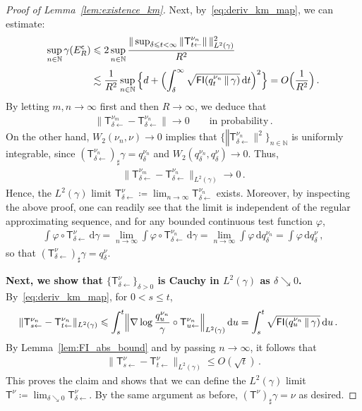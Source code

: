 \documentclass[10pt,a4paper]{amsart}
\DeclareMathOperator*{\FI}{\mathsf{FI}}
\newcommand{\KM}{\mathsf T}
\newcommand{\N}{\mathbb{N}}
\newcommand{\comp}{\mathsf c}
\newcommand*{\dd}{\, \rd}
\newcommand{\deq}{\coloneqq}
\renewcommand{\le}{\leqslant}
\newcommand{\mmid}{\,\Vert\,}
\renewcommand{\phi}{\varphi}
\newcommand*{\rd}{\mathrm{d}}
\begin{document}
\begin{proof}[Proof of Lemma~\ref{lem:existence_km}]
    Next, by~\eqref{eq:deriv_km_map}, we can estimate:
    \begin{align*}
        \sup_{n\in\N} \gamma(E_R^\comp)
        &\le 2\sup_{n\in\N} \frac{\|\sup_{\delta\le t <\infty}{\|\KM_{t\gets}^{\nu_n}}\|\,\|_{L^2(\gamma)}^2}{R^2}\\[0.25em]
        &\lesssim \frac{1}{R^2} \sup_{n\in\N}{\Bigl\{d + \Bigl(\int_\delta^\infty \sqrt{\FI(q_t^{\nu_n}\mmid \gamma)}\dd t \Bigr)^2 \Bigr\}}
        = O\Bigl(\frac{1}{R^2}\Bigr)\,.
    \end{align*}
    By letting $m,n\to\infty$ first and then $R \to \infty$, we deduce that
    \begin{align*}
        \|\mathsf T^{\nu_{m}}_{\delta\gets} - \mathsf T^{\nu_{n}}_{\delta \gets}\|\to 0 \qquad\text{in probability}\,.
    \end{align*}
    On the other hand, $W_2(\nu_n,\nu) \to 0$ implies that $\{\mathsf \|\KM^{\nu_n}_{\delta\gets}\|^2\}_{n\in\N}$ is uniformly integrable, since $(\KM^{\nu_n}_{\delta\gets})_\sharp \gamma = q_\delta^{\nu_n}$ and $W_2(q_\delta^{\nu_n}, q_\delta^\nu) \to 0$. Thus,
    \begin{align*}
        \|\mathsf T^{\nu_m}_{\delta\gets} - \mathsf T^{\nu_{n}}_{\delta\gets}\|_{L^2(\gamma)}\to 0\,.
    \end{align*}
    Hence, the $L^2(\gamma)$ limit $\KM^\nu_{\delta\gets} \deq \lim_{n\to\infty} \KM^{\nu_n}_{\delta\gets}$ exists.
    Moreover, by inspecting the above proof, one can readily see that the limit is independent of the regular approximating sequence, and for any bounded continuous test function $\phi$,
    \begin{align*}
        \int \phi\circ \KM^\nu_{\delta\gets}\dd \gamma = \lim_{n\to\infty} \int \phi\circ\KM^{\nu_n}_{\delta\gets}\dd\gamma
        = \lim_{n\to\infty} \int \phi\dd q_\delta^{\nu_n} = \int \phi\dd q_\delta^\nu\,,
    \end{align*}
    so that $(\KM^\nu_{\delta\gets})_\sharp \gamma = q_\delta^\nu$.

    \textbf{Next, we show that $\{\KM^\nu_{\delta\gets}\}_{\delta > 0}$ is Cauchy in $L^2(\gamma)$ as $\delta \searrow 0$.}
    By~\eqref{eq:deriv_km_map}, for $0 < s \le t$,
    \begin{align*}
        \|\mathsf T^{\nu_n}_{s\gets} - \mathsf T^{\nu_n}_{t\gets}\|_{L^2(\gamma)}
        &\le \int_s^t \Bigl\lVert\nabla \log \frac{q_u^{\nu_n}}{\gamma} \circ \KM_{u\gets}^{\nu_n}\Bigr\rVert_{L^2(\gamma)}\dd u
        = \int_s^t \sqrt{\FI(q_u^{\nu_n} \mmid \gamma)}\dd u\,.
    \end{align*}
    By Lemma~\ref{lem:FI_abs_bound} and by passing $n\to\infty$, it follows that
    \begin{align*}
        \|\mathsf T^{\nu}_{s\gets} - \mathsf T^{\nu}_{t\gets}\|_{L^2(\gamma)}
        \le O(\sqrt t)\,.
    \end{align*}
    This proves the claim and shows that we can define the $L^2(\gamma)$ limit $\KM^\nu \deq \lim_{\delta\searrow 0} \KM^\nu_{\delta\gets}$.
    By the same argument as before, $(\KM^\nu)_\sharp \gamma = \nu$ as desired.
\end{proof}
\end{document}

